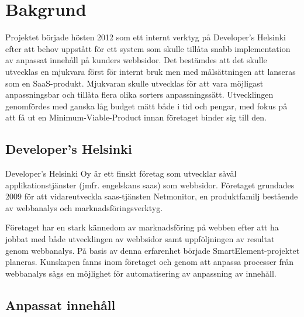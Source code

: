 \section{Bakgrund}

Projektet började hösten 2012 som ett internt verktyg på Developer's Helsinki efter att behov uppstått för ett system som skulle tillåta snabb implementation av anpassat innehåll på kunders webbsidor. Det bestämdes att det skulle utvecklas en mjukvara först för internt bruk men med målsättningen att lanseras som en SaaS-produkt. Mjukvaran skulle utvecklas för att vara möjligast anpassningsbar och tillåta flera olika sorters anpassningssätt. Utvecklingen genomfördes med ganska låg budget mätt både i tid och pengar, med fokus på att få ut en Minimum-Viable-Product innan företaget binder sig till den.

\subsection{Developer's Helsinki}

Developer's Helsinki Oy är ett finskt företag som utvecklar såväl applikationstjänster (jmfr. engelskans \gls{saas}) som webbsidor. Företaget grundades 2009 för att vidareutveckla  \gls{saas}-tjänsten Netmonitor, en produktfamilj bestående av webbanalys och marknadsföringsverktyg.

Företaget har en stark kännedom av marknadsföring på webben efter att ha jobbat med både utvecklingen av webbsidor samt uppföljningen av resultat genom webbanalys. På basis av denna erfarenhet började SmartElement-projektet planeras. Kunskapen fanns inom företaget och genom att anpassa processer från webbanalys sågs en möjlighet för automatisering av anpassning av innehåll.

\subsection{Anpassat innehåll}

